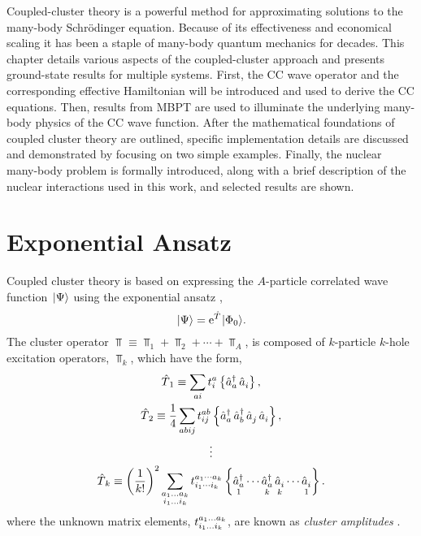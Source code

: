 \documentclass[thesis.tex]{subfiles}
\begin{document}
Coupled-cluster theory is a powerful method for approximating solutions to the many-body Schr\"odinger equation.  Because of its effectiveness and economical scaling it has been a staple of many-body quantum mechanics for decades.  This chapter details various aspects of the coupled-cluster approach and presents ground-state results for multiple systems.  First, the CC wave operator and the corresponding effective Hamiltonian will be introduced and used to derive the CC equations.  Then, results from MBPT are used to illuminate the underlying many-body physics of the CC wave function.  After the mathematical foundations of coupled cluster theory are outlined, specific implementation details are discussed and demonstrated by focusing on two simple examples.  Finally, the nuclear many-body problem is formally introduced, along with a brief description of the nuclear interactions used in this work, and selected results are shown.

\section{Exponential Ansatz} \label{section:exponentialansatz}

Coupled cluster theory is based on expressing the $A$-particle correlated wave function $\hspace{1pt}\lvert \Psi \rangle$ using the exponential ansatz \cite{COESTER1960477,CIZEK19664256},
\begin{equation} \label{eq:cc_ansatz}
  \hspace{1pt}\lvert \Psi \rangle = \operatorname{e}^{\hat{T}\hspace{-0.25pt}}\hspace{1pt}\lvert \Phi_{0} \rangle.
\end{equation}
The cluster operator $\Top \equiv \Top_{1} + \Top_{2} + \cdots + \Top_{A}$, is composed of $k$-particle $k$-hole excitation operators, $\Top_{k}$, which have the form,
\begin{gather} \label{eq:cc_amps}
  \hat{T}\hspace{-0.25pt}_{1} \equiv \sum_{ai} t^{a}_{i}\left\{\mathop{\hat{a}^{\dagger}_{a}}\mathop{\hat{a}^{}_{i}}\right\}, \notag \\
  \hat{T}\hspace{-0.25pt}_{2} \equiv \frac{1}{4}\sum_{abij} t^{ab}_{ij}\left\{\mathop{\hat{a}^{\dagger}_{a}}\mathop{\hat{a}^{\dagger}_{b}}\mathop{\hat{a}^{}_{j}}\mathop{\hat{a}^{}_{i}}\right\}, \notag \\
  \vdots \notag \\
  \hat{T}\hspace{-0.25pt}_{k} \equiv \left(\frac{1}{k!}\right)^2 \sum_{\substack{a_{1} \ldots a_{k} \\ i_{1} \ldots i_{k}}} t^{a_{1} \cdots a_{k}}_{i_{1} \cdots i_{k}}\left\{\mathop{\hat{a}^{\dagger}_{a}}_{1} \cdots \mathop{\hat{a}^{\dagger}_{a}}_{k} \mathop{\hat{a}^{}_{i}}_{k} \cdots \mathop{\hat{a}^{}_{i}}_{1}\right\}.
\end{gather}
where the unknown matrix elements, $t^{a_{1} \ldots a_{k}}_{i_{1} \ldots i_{k}}$, are known as \textit{cluster amplitudes} \cite{SHAVITT2009}.
\end{document}

